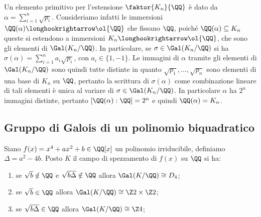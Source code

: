 \documentclass[11pt]{scrartcl}
\begin{document}
	\begin{remark}
		Un elemento primitivo per l'estensione $\faktor{K_n}{\QQ}$ è dato da 
		$\alpha =\displaystyle \sum_{i = 1}^n \sqrt{p_i}$. Consideriamo infatti le immersioni
		$\QQ(\alpha) \longhookrightarrow \ol{\QQ}$ che fissano $\QQ$, poiché 
		$\QQ(\alpha) \subseteq K_n$ queste si estendono a immersioni
		$K_n \longhookrightarrow \ol{\QQ}$, che sono gli elementi di $\Gal(K_n/\QQ)$.
		In particolare, se $\sigma \in \Gal(K_n/\QQ)$ si ha 
		$\sigma(\alpha) = \displaystyle\sum_{i = 1}^n a_i\sqrt{p_i}$, con $a_i \in \{1, -1\}$.
		Le immagini di $\alpha$ tramite gli elementi di $\Gal(K_n/\QQ)$ sono 
		quindi tutte distinte in quanto $\sqrt{p_1}, \ldots, \sqrt{p_n}$ sono
		elementi di una base di $K_n$ su $\QQ$, pertanto la scrittura di $\sigma(\alpha)$
		come combinazione lineare di tali elementi è unica al variare di 
		$\sigma \in \Gal(K_n/\QQ)$. In particolare $\alpha$ ha $2^n$ immagini distinte,
		pertanto $[\QQ(\alpha): \QQ] = 2^n$ e quindi $\QQ(\alpha) = K_n$.
	\end{remark}
	
	\newpage
	
	\subsection{Gruppo di Galois di un polinomio biquadratico}
	
	\begin{theorem}
		Siano $f(x) = x^4 + ax^2 + b \in \QQ[x]$ un polinomio irriducibile, definiamo $\Delta = a^2 - 4b$.
		Posto $K$ il campo di spezzamento di $f(x)$ su $\QQ$ si ha:
		\begin{enumerate}[(1)]
			\item se $\sqrt{b} \notin \QQ$ e $\sqrt{b\Delta} \notin \QQ$ allora $\Gal(K/\QQ) \cong D_4$;
			\item se $\sqrt{b} \in \QQ$ allora $\Gal(K/\QQ) \cong \Z2\times\Z2$;
			\item se $\sqrt{b\Delta}\in\QQ$ allora $\Gal(K/\QQ) \cong \Z4$;
		\end{enumerate}
	\end{theorem}
	
\end{document}
